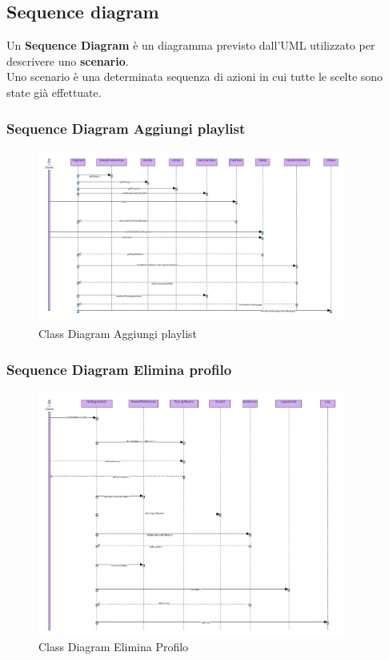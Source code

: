 \documentclass{article}
\begin{document}
		\subsection{Sequence diagram}
		Un \textbf{Sequence Diagram} è un diagramma previsto dall'UML utilizzato per descrivere uno \textbf{scenario}. \\Uno scenario è una determinata sequenza di azioni in cui tutte le scelte sono state già effettuate.
			\subsubsection{Sequence Diagram Aggiungi playlist}
			\begin{figure}[H]
				\centering
				\includegraphics[width=0.9\textwidth]{Immagini/sequencediagramaggiungi}
				\caption{Class Diagram Aggiungi playlist}
			\end{figure}
			\subsubsection{Sequence Diagram Elimina profilo}
			\begin{figure}[H]
				\centering
				\includegraphics[width=0.9\textwidth]{Immagini/sequencediagramcancella}
				\caption{Class Diagram Elimina Profilo}
			\end{figure}
\end{document}
